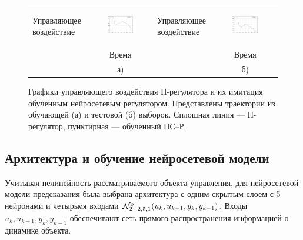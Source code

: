\begin{figure}
\centering
\begin{tabular}{lclc}
  \begin{sideways}
    {\hspace{1cm}\small Управляющее воздействие}
  \end{sideways}
  &
  \includegraphics[width=0.45\textwidth,%
    totalheight=0.25\textheight]{moby_nnc_pretr_learn}
  &
  \begin{sideways}
    {\hspace{1cm}\small Управляющее воздействие}
  \end{sideways}
  &
  \includegraphics[width=0.45\textwidth,%
    totalheight=0.25\textheight]{moby_nnc_pretr_test}
  \\
  & {\small Время} & & {\small Время}\\
  & а) & & б)\\
\end{tabular}
\caption{Графики управляющего воздействия П-регулятора и их
имитация обученным нейросетевым регулятором.  Представлены траектории
из обучающей (а) и тестовой (б) выборок.  Сплошная линия ---
П-регулятор, пунктирная --- обученный НС--Р.}
\label{fig:moby_nnc_pretr}
\end{figure}

\subsection{Архитектура и обучение нейросетевой модели}

Учитывая нелинейность рассматриваемого объекта управления, для
нейросетевой модели предсказания была выбрана архитектура с одним
скрытым слоем с 5 нейронами и четырьмя входами
$\mathcal{N}^o_{2+2,5,1}(u_k,u_{k-1},y_k,y_{k-1})$.  Входы
$u_k,u_{k-1},y_k,y_{k-1}$ обеспечивают сеть прямого распространения
информацией о динамике объекта.

